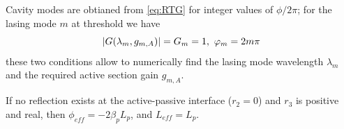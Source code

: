 Cavity modes are obtianed from \autoref{eq:RTG} for integer values of $\phi/2\pi$; for the lasing mode $m$ at threshold we have
\begin{equation}
    \abs{G(\lambda_m,g_{m,A})}=G_m=1,\ \varphi_m=2m\pi
    \label{eq:lasing_condition}
\end{equation}
these two conditions allow to numerically find the lasing mode wavelength $\lambda_m$ and the required active section gain $g_{m,A}$.



If no reflection exists at the active-passive interface ($r_2=0$) and $r_3$ is positive and real, then $\phi_{eff}=-2\beta_pL_p$, and $L_{eff}=L_p$.





